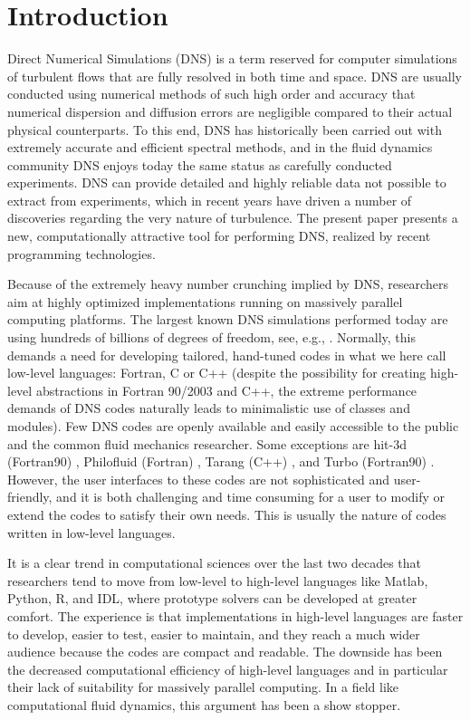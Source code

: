 \documentclass[final,3p,times,twocolumn]{elsarticle}
\begin{document}
\section{Introduction}
Direct Numerical Simulations (DNS) is a term reserved for computer simulations 
of turbulent flows that are fully resolved in both time and space. DNS are 
usually conducted using numerical methods of such high order and accuracy that 
numerical dispersion and diffusion errors are negligible compared to their 
actual physical
counterparts. To this end, DNS has historically been carried out with extremely 
accurate and efficient spectral methods, and in the fluid dynamics community 
DNS enjoys  today the same status as carefully conducted experiments. DNS can 
provide detailed and highly reliable data not possible to extract from
experiments, which in recent years have driven a number of discoveries 
regarding the very nature of turbulence. The present paper presents a new, 
computationally attractive tool for performing DNS, realized by recent 
programming technologies.

Because of the extremely heavy number crunching implied by DNS,
researchers aim at highly optimized implementations running on
massively parallel computing platforms. The largest known DNS
simulations performed today are using hundreds of billions of degrees
of freedom, see, e.g., \cite{Lee2013, deBruynKops15}. Normally, this demands a 
need for developing tailored, hand-tuned
codes in what we here call low-level languages: Fortran, C or C++ (despite
the possibility for creating high-level abstractions in Fortran 90/2003 and
C++, the extreme performance demands of DNS codes naturally leads to
minimalistic use of classes and modules). Few DNS codes are openly available 
and easily accessible to the public and the common fluid mechanics researcher. 
Some exceptions are hit-3d (Fortran90) \cite{hit-3d}, Philofluid (Fortran) 
\cite{philofluid}, Tarang (C++) \cite{tarang}, and Turbo (Fortran90)
\cite{turbo}. However, the user interfaces to these codes are not sophisticated 
and user-friendly, and it is both challenging and time consuming for a user to
modify or extend the codes to satisfy their own needs. This is usually
the nature of codes written in low-level languages.

It is a clear trend in computational sciences over the last two decades
that researchers tend to move from low-level to high-level languages
like Matlab, Python, R, and IDL, where prototype solvers can be developed at 
greater comfort. The experience is that implementations
in high-level languages are faster to develop, easier to test,
easier to maintain, and they reach a much wider audience because the codes are 
compact and readable. The downside has been the decreased computational
efficiency of high-level languages and in particular their lack of
suitability for massively parallel computing. In a field like computational
fluid dynamics, this argument has been a show stopper. 
\end{document}
